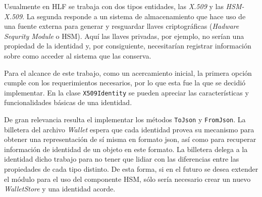 Usualmente en HLF se trabaja con dos tipos entidades, las \emph{X.509} y las \emph{HSM-X.509}. La segunda responde a un sistema de almacenamiento que hace uso de una fuente externa para generar y resguardar llaves criptogr\'aficas (\emph{Hadware Sequrity Module} o HSM). Aqu\'i las llaves privadas, por ejemplo, no ser\'ian una propiedad de la identidad y, por consiguiente, necesitar\'ian registrar informaci\'on sobre como acceder al sistema que las conserva.

Para el alcance de este trabajo, como un acercamiento inicial, la primera opci\'on cumple con los requerimientos necesarios, por lo que esta fue la que se decidi\'o implementar. En la clase \texttt{X509Identity} se pueden apreciar las caracter\'isticas y funcionalidades b\'asicas de una identidad.

De gran relevancia resulta el implementar los m\'etodos \texttt{ToJson} y \texttt{FromJson}. La billetera del archivo \emph{Wallet} espera que cada identidad provea su mecanismo para obtener una representaci\'on de s\'i misma en formato json, as\'i como para recuperar informaci\'on de identidad de un objeto en este formato. La billetera delega a la identidad dicho trabajo para no tener que lidiar con las diferencias entre las propiedades de cada tipo distinto. De esta forma, si en el futuro se desea extender el m\'odulo para el uso del componente HSM, s\'olo ser\'ia necesario crear un nuevo \emph{WalletStore} y una identidad acorde.